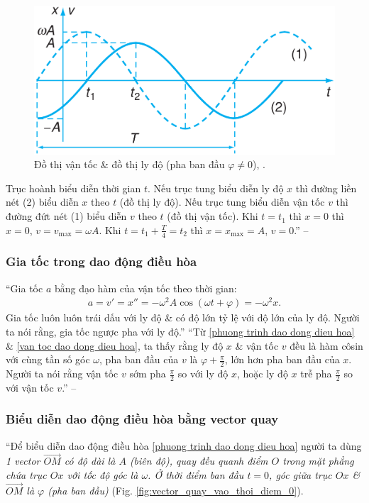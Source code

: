 \documentclass{article}
\numberwithin{equation}{section}
\begin{document}
\begin{figure}[H]
	\centering
	\includegraphics[scale=0.15]{do_thi_van_toc_ly_do_thoi_gian}
	\caption{Đồ thị vận tốc \& đồ thị ly độ (pha ban đầu $\varphi\ne 0$), \cite[Hình 6.5, p. 32]{SGK_Vat_Ly_12_nang_cao}.}
	\label{fig:do_thi_van_toc_ly_do_thoi_gian}
\end{figure}
Trục hoành biểu diễn thời gian $t$. Nếu trục tung biểu diễn ly độ $x$ thì đường liền nét (2) biểu diễn $x$ theo $t$ (đồ thị ly độ). Nếu trục tung biểu diễn vận tốc $v$ thì đường đứt nét (1) biểu diễn $v$ theo $t$ (đồ thị vận tốc). Khi $t = t_1$ thì $x = 0$ thì $x = 0$, $v = v_{\max} = \omega A$. Khi $t = t_1 + \frac{T}{4} = t_2$ thì $x = x_{\max} = A$, $v = 0$.'' -- \cite[p. 32]{SGK_Vat_Ly_12_nang_cao}

\subsubsection{Gia tốc trong dao động điều hòa}
``Gia tốc $a$ bằng đạo hàm của vận tốc theo thời gian:
\begin{align}
	\label{gia toc dao dong dieu hoa}
	a = v' = x'' = -\omega^2A\cos(\omega t + \varphi) = -\omega^2x.
\end{align}
Gia tốc luôn luôn trái dấu với ly độ \& có độ lớn tỷ lệ với độ lớn của ly độ. Người ta nói rằng, gia tốc ngược pha với ly độ.'' ``Từ \eqref{phuong trinh dao dong dieu hoa} \& \eqref{van toc dao dong dieu hoa}, ta thấy rằng ly độ $x$ \& vận tốc $v$ đều là hàm côsin với cùng tần số góc $\omega$, pha ban đầu của $v$ là $\varphi + \frac{\pi}{2}$, lớn hơn pha ban đầu của $x$. Người ta nói rằng vận tốc $v$ sớm pha $\frac{\pi}{2}$ so với ly độ $x$, hoặc ly độ $x$ trễ pha $\frac{\pi}{2}$ so với vận tốc $v$.'' -- \cite[p. 33]{SGK_Vat_Ly_12_nang_cao}

\subsubsection{Biểu diễn dao động điều hòa bằng vector quay}
``Để biểu diễn dao động điều hòa \eqref{phuong trinh dao dong dieu hoa} người ta dùng \textit{1 vector $\overrightarrow{OM}$ có độ dài là $A$ (biên độ), quay đều quanh điểm $O$ trong mặt phẳng chứa trục $Ox$ với tốc độ góc là $\omega$. Ở thời điểm ban đầu $t = 0$, góc giữa trục $Ox$ \& $\overrightarrow{OM}$ là $\varphi$ (pha ban đầu)} (Fig. \ref{fig:vector_quay_vao_thoi_diem_0}).
\end{document}

